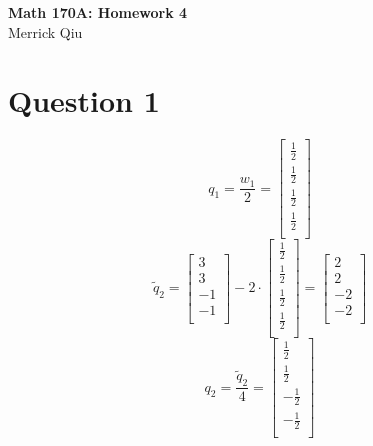 \documentclass{article}
\begin{document}
\begin{center}
	\huge{\bf Math 170A: Homework 4} \\
	Merrick Qiu
\end{center}

\section*{Question 1}
\[
    q_1 = \frac{w_1}{2} = \begin{bmatrix} 
        \frac{1}{2} \\ \frac{1}{2} \\ \frac{1}{2} \\ \frac{1}{2} \\
    \end{bmatrix}
\]
\[
    \tilde{q}_2 = \begin{bmatrix} 
        3 \\ 3 \\ -1 \\ -1 \\
    \end{bmatrix} -
    2\cdot \begin{bmatrix} 
        \frac{1}{2} \\ \frac{1}{2} \\ \frac{1}{2} \\\frac{1}{2} \\
    \end{bmatrix}
    = \begin{bmatrix}
        2 \\ 2 \\ -2 \\ -2 \\
    \end{bmatrix}
\]
\[
    q_2 = \frac{\tilde{q}_2}{4} = \begin{bmatrix} 
        \frac{1}{2} \\ \frac{1}{2} \\ -\frac{1}{2} \\ -\frac{1}{2} \\
    \end{bmatrix}
\]
\end{document}
